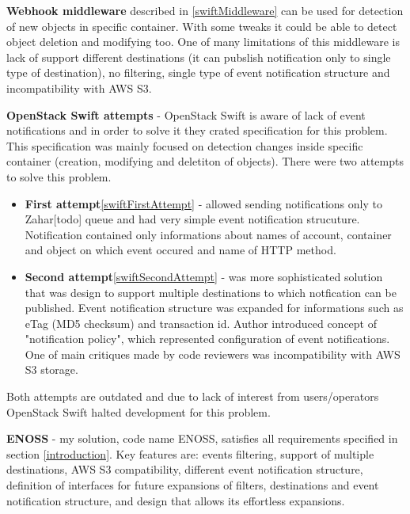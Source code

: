\documentclass{ExcelAtFIT}
\begin{document}
\textbf{Webhook middleware} described in \ref{swiftMiddleware} can be used for detection of new objects in specific container. With some tweaks it could be able to detect object deletion and modifying too. One of many limitations of this middleware is lack of support different destinations (it can pubslish notification only to single type of destination), no filtering, single type of event notification structure and incompatibility with AWS S3.

\textbf{OpenStack Swift attempts} - OpenStack Swift is aware of lack of event notifications and in order to solve it they crated specification for this problem\cite{swiftProblem}. This specification was mainly focused on detection changes inside specific container (creation, modifying and deletiton of objects). There were two attempts to solve this problem.
\begin{itemize}
	\item \textbf{First attempt}\ref{swiftFirstAttempt} - allowed sending notifications only to Zahar[todo] queue and had very simple event notification strucuture. Notification contained only informations about names of account, container and object on which event occured and name of HTTP method.
	\item \textbf{Second attempt}\ref{swiftSecondAttempt} - was more sophisticated solution that was design to support multiple destinations to which notfication can be published. Event notification structure was expanded for informations such as eTag (MD5 checksum) and transaction id. Author introduced concept of "notification policy", which represented configuration of event notifications. One of main critiques made by code reviewers was incompatibility with AWS S3 storage.
\end{itemize}

Both attempts are outdated and due to lack of interest from users/operators OpenStack Swift halted development for this problem.


\textbf{ENOSS} - my solution, code name ENOSS, satisfies all requirements specified in section \ref{introduction}. Key features are: events filtering, support of multiple destinations, AWS S3 compatibility, different event notification structure, definition of interfaces for future expansions of filters, destinations and event notification structure, and design that allows its effortless expansions. %
\end{document}

